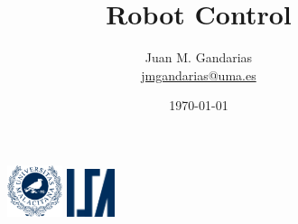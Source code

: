 \documentclass[10pt, aspectratio=169]{beamer}
\title[\href{https://jmgandarias.com}{\textcolor{white}{jmgandarias.com}}]{Robot Control}
\theoremstyle{remark}
\theoremstyle{definition}
\begin{document}
\author[Systems Engineering and Automation]{
	\large
	Juan M. Gandarias\\
    \footnotesize \href{mailto:jmgandarias@uma.es}{jmgandarias@uma.es}
}



\date{\today}

\begin{noheadline}
\begin{frame}
    \maketitle
    \vspace{-1cm}
    \begin{figure}
		\centering
		\includegraphics[height=1.5cm]{./style_files_uma/logo_uma}
        \hspace{10cm}
        \includegraphics[height=1.4cm]{./style_files_uma/logo_isa}
	\end{figure}
 \end{frame}
\end{noheadline}
\end{document}
